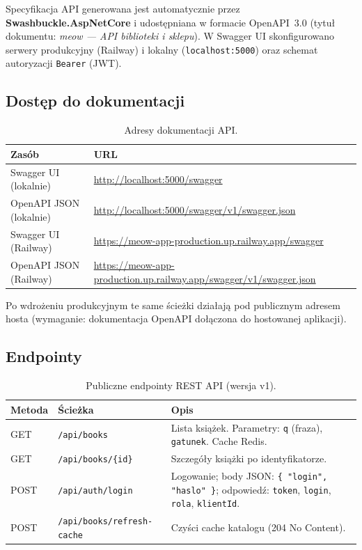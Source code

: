 \documentclass[12pt,a4paper]{article}
\begin{document}
Specyfikacja API generowana jest automatycznie przez \textbf{Swashbuckle.AspNetCore}
i udostępniana w formacie OpenAPI~3.0 (tytuł dokumentu: \textit{meow --- API biblioteki i sklepu}).
W Swagger UI skonfigurowano serwery produkcyjny (Railway) i lokalny (\texttt{localhost:5000})
oraz schemat autoryzacji \texttt{Bearer} (JWT).

\subsection{Dostęp do dokumentacji}

\begin{table}[H]
\centering
\caption{Adresy dokumentacji API.}
\begin{tabular}{@{}ll@{}}
\toprule
\textbf{Zasób} & \textbf{URL} \\
\midrule
Swagger UI (lokalnie) & \url{http://localhost:5000/swagger} \\
OpenAPI JSON (lokalnie) & \url{http://localhost:5000/swagger/v1/swagger.json} \\
Swagger UI (Railway) & \url{https://meow-app-production.up.railway.app/swagger} \\
OpenAPI JSON (Railway) & \url{https://meow-app-production.up.railway.app/swagger/v1/swagger.json} \\
\bottomrule
\end{tabular}
\end{table}

Po wdrożeniu produkcyjnym te same ścieżki działają pod publicznym adresem hosta
(wymaganie: dokumentacja OpenAPI dołączona do hostowanej aplikacji).

\subsection{Endpointy}

\begin{table}[H]
\centering
\caption{Publiczne endpointy REST API (wersja v1).}
\begin{tabular}{@{}llp{}@{}}
\toprule
\textbf{Metoda} & \textbf{Ścieżka} & \textbf{Opis} \\
\midrule
GET & \texttt{/api/books} &
    Lista książek. Parametry: \texttt{q} (fraza), \texttt{gatunek}. Cache Redis. \\
GET & \texttt{/api/books/\{id\}} &
    Szczegóły książki po identyfikatorze. \\
POST & \texttt{/api/auth/login} &
    Logowanie; body JSON: \texttt{\{ "login", "haslo" \}}; odpowiedź: \texttt{token}, \texttt{login}, \texttt{rola}, \texttt{klientId}. \\
POST & \texttt{/api/books/refresh-cache} &
    Czyści cache katalogu (204 No Content). \\
\bottomrule
\end{tabular}
\end{table}
\end{document}
